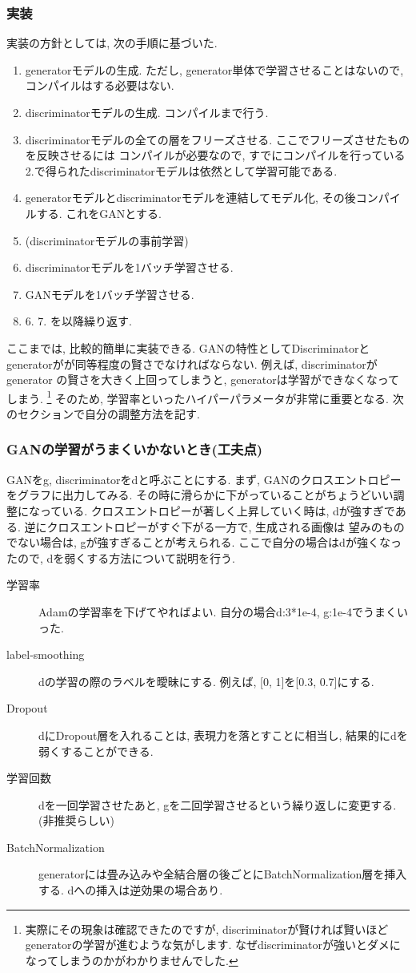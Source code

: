 \documentclass[a4paper,11pt]{jsarticle}
\begin{document}
\subsubsection*{実装}
実装の方針としては, 次の手順に基づいた.
\begin{enumerate}
  \item generatorモデルの生成. ただし, generator単体で学習させることはないので, コンパイルはする必要はない.
  \item discriminatorモデルの生成. コンパイルまで行う.
  \item discriminatorモデルの全ての層をフリーズさせる. ここでフリーズさせたものを反映させるには
        コンパイルが必要なので, すでにコンパイルを行っている2.で得られたdiscriminatorモデルは依然として学習可能である.
  \item generatorモデルとdiscriminatorモデルを連結してモデル化, その後コンパイルする. これをGANとする.
  \item (discriminatorモデルの事前学習)
  \item discriminatorモデルを1バッチ学習させる.
  \item GANモデルを1バッチ学習させる.
  \item 6. 7. を以降繰り返す.
\end{enumerate}

ここまでは, 比較的簡単に実装できる. GANの特性としてDiscriminatorとgeneratorがが同等程度の賢さでなければならない. 例えば, discriminatorがgenerator
の賢さを大きく上回ってしまうと, generatorは学習ができなくなってしまう. \footnote{実際にその現象は確認できたのですが, discriminatorが賢ければ賢いほどgeneratorの学習が進むような気がします.
  なぜdiscriminatorが強いとダメになってしまうのかがわかりませんでした.}
そのため, 学習率といったハイパーパラメータが非常に重要となる. 次のセクションで自分の調整方法を記す.

\subsubsection*{GANの学習がうまくいかないとき(工夫点)}
GANをg, discriminatorをdと呼ぶことにする.
まず, GANのクロスエントロピーをグラフに出力してみる. その時に滑らかに下がっていることがちょうどいい調整になっている.
クロスエントロピーが著しく上昇していく時は, dが強すぎである. 逆にクロスエントロピーがすぐ下がる一方で, 生成される画像は
望みのものでない場合は, gが強すぎることが考えられる.
ここで自分の場合はdが強くなったので, dを弱くする方法について説明を行う.
\begin{description}
  \item[学習率] Adamの学習率を下げてやればよい. 自分の場合d:3*1e-4, g:1e-4でうまくいった.
  \item[label-smoothing] dの学習の際のラベルを曖昧にする. 例えば, [0, 1]を[0.3, 0.7]にする.
  \item[Dropout] dにDropout層を入れることは, 表現力を落とすことに相当し, 結果的にdを弱くすることができる.
  \item[学習回数] dを一回学習させたあと, gを二回学習させるという繰り返しに変更する.(非推奨らしい)
  \item[BatchNormalization] generatorには畳み込みや全結合層の後ごとにBatchNormalization層を挿入する. dへの挿入は逆効果の場合あり.
\end{description}
\end{document}
